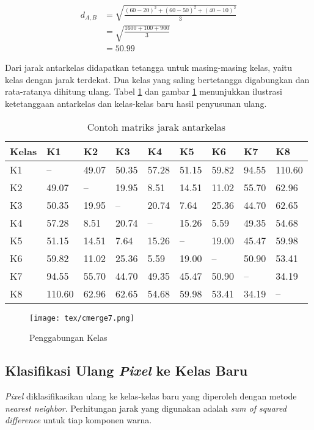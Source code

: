 \documentclass[laporan.tex]{subfiles}
\begin{document}
\begin{align*}
d_{A,B} & = \sqrt{\frac{(60-20)^2 + (60-50)^2 + (40-10)^2}{3}} \\
& =  \sqrt{\frac{1600 + 100 + 900}{3}} \\
& = 50.99
\end{align*}

Dari jarak antarkelas didapatkan tetangga untuk masing-masing kelas, yaitu kelas dengan jarak terdekat. Dua kelas yang saling bertetangga digabungkan dan rata-ratanya dihitung ulang. Tabel \ref{table:dtx1} dan gambar \ref{fig:neighborhood} menunjukkan ilustrasi ketetanggaan antarkelas dan kelas-kelas baru hasil penyusunan ulang.

\begin{table}[h]
\centering
\begin{tabular}{|l|l|l|l|l|l|l|l|l|}
\hline
Kelas & K1 & K2 & K3 & K4 & K5 & K6 & K7 & K8 \\
\hline
K1 & -- & 49.07 & 50.35 & 57.28 & 51.15 & 59.82 & 94.55 & 110.60 \\
K2 & 49.07 & -- & 19.95 & 8.51 & 14.51 & 11.02 & 55.70 & 62.96 \\
K3 & 50.35 & 19.95 & -- & 20.74 & 7.64 & 25.36 & 44.70 & 62.65 \\
K4 & 57.28 & 8.51 & 20.74 & -- & 15.26 & 5.59 & 49.35 & 54.68 \\
K5 & 51.15 & 14.51 & 7.64 & 15.26 & -- & 19.00 & 45.47 & 59.98 \\
K6 & 59.82 & 11.02 & 25.36 & 5.59 & 19.00 & -- & 50.90 & 53.41 \\
K7 & 94.55 & 55.70 & 44.70 & 49.35 & 45.47 & 50.90 & -- & 34.19 \\
K8 & 110.60 & 62.96 & 62.65 & 54.68 & 59.98 & 53.41 & 34.19 & -- \\
\hline
\end{tabular}
\caption{Contoh matriks jarak antarkelas}
\label{table:dtx1}
\end{table}

\begin{figure}[h]
\centering
\texttt{[image: tex/cmerge7.png]}
\caption{Penggabungan Kelas}
\label{fig:neighborhood}
\end{figure}

\subsection{Klasifikasi Ulang \emph{Pixel} ke Kelas Baru}

\emph{Pixel} diklasifikasikan ulang ke kelas-kelas baru yang diperoleh dengan metode \emph{nearest neighbor}. Perhitungan jarak yang digunakan adalah \emph{sum of squared difference} untuk tiap komponen warna.
\end{document}
